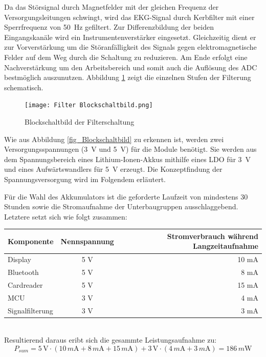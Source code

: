 Da das Störsignal durch Magnetfelder mit der gleichen Frequenz der Versorgungsleitungen schwingt, wird das EKG-Signal durch Kerbfilter mit einer Sperrfrequenz von \SI{50}{\hertz} gefiltert. Zur Differenzbildung der beiden Eingangskanäle wird ein Instrumentenverstärker eingesetzt. Gleichzeitig dient er zur Vorverstärkung um die Störanfälligkeit des Signals gegen elektromagnetische Felder auf dem Weg durch die Schaltung zu reduzieren. Am Ende erfolgt eine Nachverstärkung um den Arbeitsbereich und somit auch die Auflösung des ADC bestmöglich auszunutzen. Abbildung \ref{fig_Blockschaltbild Filter} zeigt die einzelnen Stufen der Filterung schematisch.

\begin{figure} [!h]
	\texttt{[image: Filter Blockschaltbild.png]}
	\caption{Blockschaltbild der Filterschaltung}
	\label{fig_Blockschaltbild Filter} 
\end{figure}

Wie aus Abbildung \ref{fig_Blockschaltbild} zu erkennen ist, werden zwei Versorgungsspannungen (\SI{3}{\volt}  und \SI{5}{\volt}) für die Module benötigt. Sie werden aus dem Spannungsbereich eines Lithium-Ionen-Akkus mithilfe eines LDO für \SI{3}{\volt} und eines Aufwärtswandlers für \SI{5}{\volt} erzeugt. Die Konzeptfindung der Spannungsversorgung wird im Folgendem erläutert.

Für die Wahl des Akkumulators ist die geforderte Laufzeit von mindestens 30 Stunden sowie die Stromaufnahme der Unterbaugruppen ausschlaggebend. Letztere setzt sich wie folgt zusammen:\\

\begin{tabular}[h]{l|c|r}
Komponente & Nennspannung & Stromverbrauch während Langzeitaufnahme\\
\hline
Display & 5 V & 10 mA \\
Bluetooth & 5 V & 8 mA \\
Cardreader & 5 V & 15 mA \\
MCU & 3 V & 4 mA \\
Signalfilterung & 3 V & 3 mA \\
\end{tabular}\\
Resultierend daraus eribt sich die gesammte Leistungsaufnahme zu: 
\[ P_{sum} = 5\,\mbox{V} \cdot (10\,m \mbox{A} + 8\,m\mbox{A} + 15\,m\mbox{A}) + 3\,\mbox{V} \cdot (4\, m\mbox{A} + 3 \,m\mbox{A}) = 186\, m\mbox{W} \]


